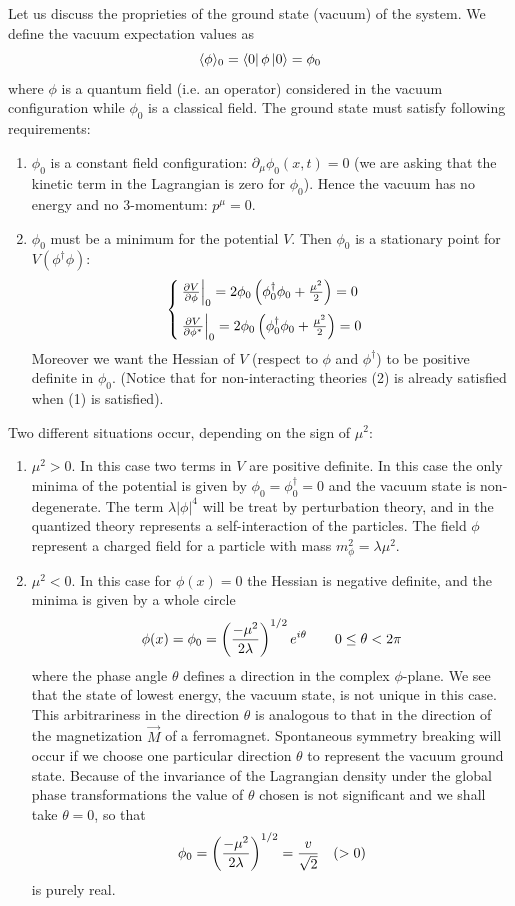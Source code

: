 \documentclass[TheoreticalPhy_ModB.tex]{subfiles}
\begin{document}
Let us discuss the proprieties of the ground state (vacuum) of the system. We define the vacuum expectation values as 
\[\langle\phi\rangle_0=\bra0\phi\ket0=\phi_0\]
where $\phi$ is a quantum field (i.e. an operator) considered in the vacuum configuration while $\phi_0$ is a classical field. The ground state must satisfy following requirements:
\begin{enumerate}[label=(\arabic*)]
\item $\phi_0$ is a constant field configuration: $\partial_\mu\phi_0(x,t)=0$ (we are asking that the kinetic term in the Lagrangian is zero for $\phi_0$). Hence the vacuum has no energy and no 3-momentum: $p^\mu=0$.
\item $\phi_0$ must be a minimum for the potential $V$. Then $\phi_0$ is a stationary point for $V(\phi^\dagger\phi)$:
\[\begin{cases}
\frac{\partial V}{\partial\phi}\Big\vert_0=2\phi_0\left(\phi_0^\dagger\phi_0+\frac{\mu^2}2\right)=0\vspace{0.2cm}\\
\frac{\partial V}{\partial\phi^*}\Big\vert_0=2\phi_0\left(\phi_0^\dagger\phi_0+\frac{\mu^2}2\right)=0
\end{cases}\]
Moreover we want the Hessian of $V$ (respect to $\phi$ and $\phi^\dagger$) to be positive definite in $\phi_0$.
(Notice that for non-interacting theories (2) is already satisfied when (1) is satisfied).
\end{enumerate}
Two different situations occur, depending on the sign of $\mu^2$:
\begin{enumerate}[label=(\alph*)]
\item $\mu^2>0$. In this case two terms in $V$ are positive definite. In this case the only minima of the potential is given by $\phi_0=\phi_0^\dagger=0$ and the vacuum state is non-degenerate. The term $\lambda|\phi|^4$ will be treat by perturbation theory, and in the quantized theory represents a self-interaction of the particles. The field $\phi$ represent a charged field for a particle with mass $m_\phi^2=\lambda\mu^2$.
\item $\mu^2<0$. In this case for $\phi(x)=0$ the Hessian is negative definite, and the minima is given by a whole circle
\[\phi(x)=\phi_0=\left(\frac{-\mu^2}{2\lambda}\right)^{1/2}e^{i\theta}\qquad0\leq\theta<2\pi\]
where the phase angle $\theta$ defines a direction in the complex $\phi$-plane. We see that the state of lowest energy, the vacuum state, is not unique in this case. This arbitrariness in the direction $\theta$ is analogous to that in the direction of the magnetization $\vec M$ of a ferromagnet. Spontaneous symmetry breaking will occur if we choose one particular direction $\theta$ to represent the vacuum ground state. Because of the invariance of the Lagrangian density under the global phase transformations the value of $\theta$ chosen is not significant and we shall take $\theta=0$, so that
\[\phi_0=\left(\frac{-\mu^2}{2\lambda}\right)^{1/2}=\frac v{\sqrt2}\quad(>0)\]
is purely real.
\end{enumerate}
\end{document}
